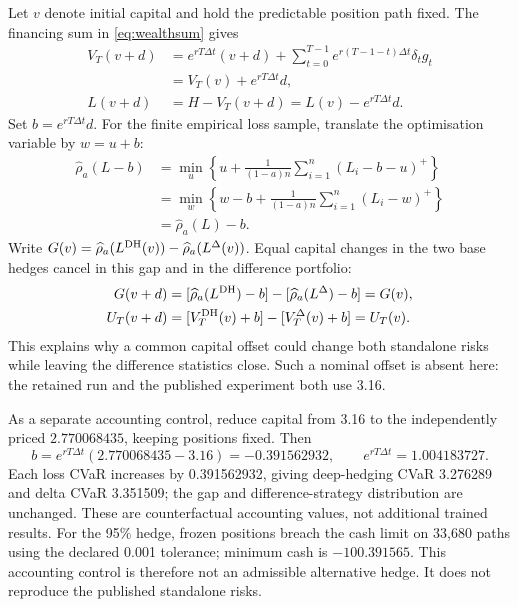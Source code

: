 \documentclass[11pt,a4paper]{article}
\newcommand{\dt}{\Delta t}
\theoremstyle{remark}
\begin{document}
Let $v$ denote initial capital and hold the predictable position path fixed. The financing sum in \eqref{eq:wealthsum} gives
\begin{align}
 V_T(v+d)&=e^{rT\dt}(v+d)+
       \sum_{t=0}^{T-1}e^{r(T-1-t)\dt}\delta_tg_t\nonumber\\
 &=V_T(v)+e^{rT\dt}d,\nonumber\\
 L(v+d)&=H-V_T(v+d)=L(v)-e^{rT\dt}d.
\end{align}
Set $b=e^{rT\dt}d$. For the finite empirical loss sample, translate the optimisation variable by $w=u+b$:
\begin{align}
 \widehat\rho_a(L-b)
 &=\min_u\left\{u+\frac1{(1-a)n}
              \sum_{i=1}^n(L_i-b-u)^+\right\}\nonumber\\
 &=\min_w\left\{w-b+\frac1{(1-a)n}
              \sum_{i=1}^n(L_i-w)^+\right\}\nonumber\\
 &=\widehat\rho_a(L)-b.
\end{align}
Write $G(v)=\widehat\rho_a(L^{\rm DH}(v))-\widehat\rho_a(L^\Delta(v))$. Equal capital changes in the two base hedges cancel in this gap and in the difference portfolio:
\begin{align}
 G(v+d)&=[\widehat\rho_a(L^{\rm DH})-b]
            -[\widehat\rho_a(L^\Delta)-b]=G(v),\nonumber\\
 U_T(v+d)&=[V_T^{\rm DH}(v)+b]-[V_T^\Delta(v)+b]=U_T(v).
\end{align}
This explains why a common capital offset could change both standalone risks while leaving the difference statistics close. Such a nominal offset is absent here: the retained run and the published experiment both use 3.16.

As a separate accounting control, reduce capital from 3.16 to the independently priced $2.770068435$, keeping positions fixed. Then
\begin{equation}
 b=e^{rT\dt}(2.770068435-3.16)=-0.391562932,
 \qquad e^{rT\dt}=1.004183727.
 \label{eq:capitaltranslation}
\end{equation}
Each loss CVaR increases by 0.391562932, giving deep-hedging CVaR 3.276289 and delta CVaR 3.351509; the gap and difference-strategy distribution are unchanged. These are counterfactual accounting values, not additional trained results. For the 95\% hedge, frozen positions breach the cash limit on 33,680 paths using the declared 0.001 tolerance; minimum cash is $-100.391565$. This accounting control is therefore not an admissible alternative hedge. It does not reproduce the published standalone risks.
\end{document}
